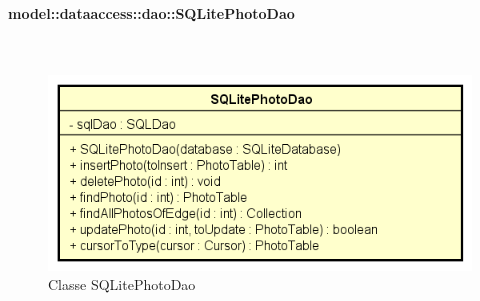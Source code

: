 \documentclass[../DefinizioneDiProdotto.tex]{subfiles}
\begin{document}
\paragraph{model::dataaccess::dao::SQLitePhotoDao}
\
\begin{figure}[H]
	\centering
	\includegraphics[width=\maxwidth]{img/SQLitePhotoDao.png}
	\caption{Classe SQLitePhotoDao}\label{fig:model::dataaccess::dao::SQLitePhotoDao} 
\end{figure}
\end{document}
